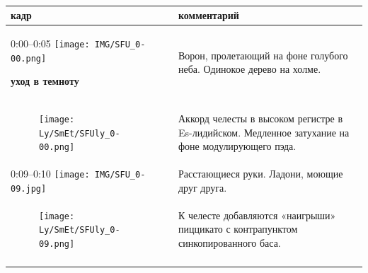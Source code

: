 \begin{longtable}[]{@{}ll@{}}
\toprule
\begin{minipage}[b]{0.32\columnwidth}\raggedright\strut
кадр\strut
\end{minipage} & \begin{minipage}[b]{0.62\columnwidth}\raggedright\strut
комментарий\strut
\end{minipage}\tabularnewline
\midrule
\endhead
\begin{minipage}[t]{0.48\columnwidth}\raggedright\strut
0:00--0:05
\texttt{[image: IMG/SFU\_0-00.png]}

\textbf{уход в темноту}\strut
\end{minipage} & \begin{minipage}[t]{0.48\columnwidth}\raggedright\strut
Ворон, пролетающий на фоне
голубого неба.
Одинокое дерево на холме.\strut
\end{minipage}\tabularnewline
\begin{minipage}[t]{0.32\columnwidth}\raggedright\strut
\begin{figure}
\centering
\texttt{[image: Ly/SmEt/SFUly\_0-00.png]}
\caption{}
\end{figure}
\strut
\end{minipage} & \begin{minipage}[t]{0.62\columnwidth}\raggedright\strut
Аккорд челесты в высоком регистре в Es-лидийском.
Медленное затухание на фоне модулирующего пэда.\strut
\end{minipage}\tabularnewline
\begin{minipage}[t]{0.32\columnwidth}\raggedright\strut
0:09--0:10
\texttt{[image: IMG/SFU\_0-09.jpg]}\strut
\end{minipage} & \begin{minipage}[t]{0.62\columnwidth}\raggedright\strut
Расстающиеся руки.
Ладони, моющие друг друга.\strut
\end{minipage}\tabularnewline
\begin{minipage}[t]{0.32\columnwidth}\raggedright\strut
\begin{figure}
\centering
\texttt{[image: Ly/SmEt/SFUly\_0-09.png]}
\caption{}
\end{figure}
\strut
\end{minipage} & \begin{minipage}[t]{0.62\columnwidth}\raggedright\strut
К челесте добавляются «наигрыши» пиццикато с
контрапунктом синкопированного баса.\strut
\end{minipage}\tabularnewline
\begin{minipage}[t]{0.32\columnwidth}\raggedright\strut

\end{minipage}
\end{longtable}
